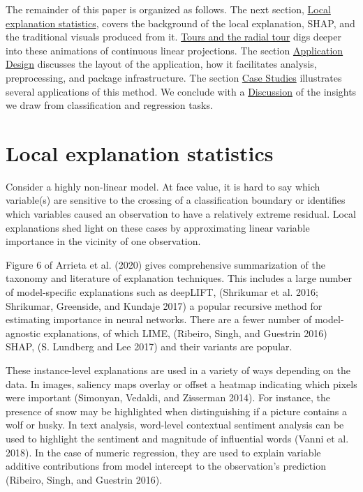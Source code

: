 \documentclass[
  article]{article}
\begin{document}
The remainder of this paper is organized as follows. The next section, \protect\hyperlink{sec:explanations}{Local explanation statistics}, covers the background of the local explanation, SHAP, and the traditional visuals produced from it. \protect\hyperlink{sec:tour}{Tours and the radial tour} digs deeper into these animations of continuous linear projections. The section \protect\hyperlink{sec:applicationdesign}{Application Design} discusses the layout of the application, how it facilitates analysis, preprocessing, and package infrastructure. The section \protect\hyperlink{sec:casestudies}{Case Studies} illustrates several applications of this method. We conclude with a \protect\hyperlink{sec:discussion}{Discussion} of the insights we draw from classification and regression tasks.

\hypertarget{sec:explanations}{%
\section{Local explanation statistics}\label{sec:explanations}}

Consider a highly non-linear model. At face value, it is hard to say which variable(s) are sensitive to the crossing of a classification boundary or identifies which variables caused an observation to have a relatively extreme residual. Local explanations shed light on these cases by approximating linear variable importance in the vicinity of one observation.

Figure 6 of Arrieta et al. (2020) gives comprehensive summarization of the taxonomy and literature of explanation techniques. This includes a large number of model-specific explanations such as deepLIFT, (Shrikumar et al. 2016; Shrikumar, Greenside, and Kundaje 2017) a popular recursive method for estimating importance in neural networks. There are a fewer number of model-agnostic explanations, of which LIME, (Ribeiro, Singh, and Guestrin 2016) SHAP, (S. Lundberg and Lee 2017) and their variants are popular.

These instance-level explanations are used in a variety of ways depending on the data. In images, saliency maps overlay or offset a heatmap indicating which pixels were important (Simonyan, Vedaldi, and Zisserman 2014). For instance, the presence of snow may be highlighted when distinguishing if a picture contains a wolf or husky. In text analysis, word-level contextual sentiment analysis can be used to highlight the sentiment and magnitude of influential words (Vanni et al. 2018). In the case of numeric regression, they are used to explain variable additive contributions from model intercept to the observation's prediction (Ribeiro, Singh, and Guestrin 2016).
\end{document}
